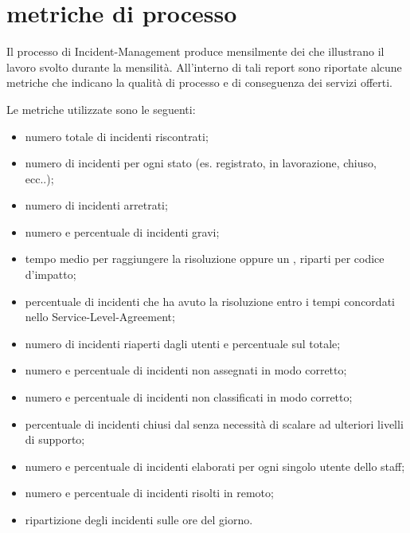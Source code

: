 %
%
\section[Metriche di processo]{metriche di processo}
\label{im-metrics}
Il processo di \ac{Incident-Management} produce mensilmente dei  che illustrano il lavoro svolto durante la mensilità. All'interno di tali report sono riportate alcune metriche che indicano la qualità di processo e di conseguenza dei servizi offerti.

Le metriche utilizzate sono le seguenti:

\begin{itemize}
\item{numero totale di incidenti riscontrati;}
\item{numero di incidenti per ogni stato (es. registrato, in lavorazione, chiuso, ecc..);}
\item{numero di incidenti arretrati;}
\item{numero e percentuale di incidenti gravi;}
\item{tempo medio per raggiungere la risoluzione oppure un , riparti per codice d'impatto;}
\item{percentuale di incidenti che ha avuto la risoluzione entro i tempi concordati nello \ac{Service-Level-Agreement};}
\item{numero di incidenti riaperti dagli utenti e percentuale sul totale;}
\item{numero e percentuale di incidenti non assegnati in modo corretto;}
\item{numero e percentuale di incidenti non classificati in modo corretto;}
\item{percentuale di incidenti chiusi dal  senza necessità di scalare ad ulteriori livelli di supporto;}
\item{numero e percentuale di incidenti elaborati per ogni singolo utente dello staff;}
\item{numero e percentuale di incidenti risolti in remoto;}
\item{ripartizione degli incidenti sulle ore del giorno.}
\end{itemize}